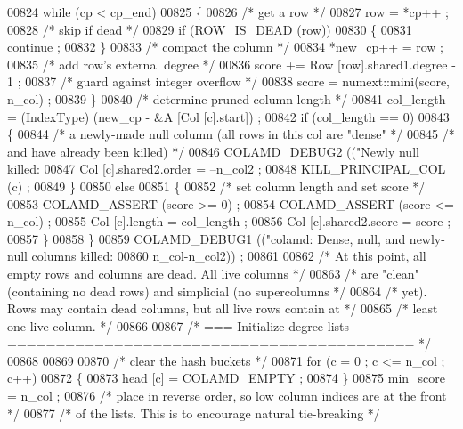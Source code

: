 \begin{DoxyCode}
{{{{{{{{{{{{{{00824     \textcolor{keywordflow}{while} (cp < cp\_end)
00825     \{
00826       \textcolor{comment}{/* get a row */}
00827       row = *cp++ ;
00828       \textcolor{comment}{/* skip if dead */}
00829       \textcolor{keywordflow}{if} (ROW\_IS\_DEAD (row))
00830       \{
00831     continue ;
00832       \}
00833       \textcolor{comment}{/* compact the column */}
00834       *new\_cp++ = row ;
00835       \textcolor{comment}{/* add row's external degree */}
00836       score += Row [row].shared1.degree - 1 ;
00837       \textcolor{comment}{/* guard against integer overflow */}
00838       score = numext::mini(score, n\_col) ;
00839     \}
00840     \textcolor{comment}{/* determine pruned column length */}
00841     col\_length = (IndexType) (new\_cp - &A [Col [c].start]) ;
00842     \textcolor{keywordflow}{if} (col\_length == 0)
00843     \{
00844       \textcolor{comment}{/* a newly-made null column (all rows in this col are "dense" */}
00845       \textcolor{comment}{/* and have already been killed) */}
00846       COLAMD\_DEBUG2 ((\textcolor{stringliteral}{"Newly null killed: %
00847       Col [c].shared2.order = --n\_col2 ;
00848       KILL\_PRINCIPAL\_COL (c) ;
00849     \}
00850     \textcolor{keywordflow}{else}
00851     \{
00852       \textcolor{comment}{/* set column length and set score */}
00853       COLAMD\_ASSERT (score >= 0) ;
00854       COLAMD\_ASSERT (score <= n\_col) ;
00855       Col [c].length = col\_length ;
00856       Col [c].shared2.score = score ;
00857     \}
00858   \}
00859   COLAMD\_DEBUG1 ((\textcolor{stringliteral}{"colamd: Dense, null, and newly-null columns killed: %
00860           n\_col-n\_col2)) ;
00861 
00862   \textcolor{comment}{/* At this point, all empty rows and columns are dead.  All live columns */}
00863   \textcolor{comment}{/* are "clean" (containing no dead rows) and simplicial (no supercolumns */}
00864   \textcolor{comment}{/* yet).  Rows may contain dead columns, but all live rows contain at */}
00865   \textcolor{comment}{/* least one live column. */}
00866 
00867   \textcolor{comment}{/* === Initialize degree lists ========================================== */}
00868 
00869 
00870   \textcolor{comment}{/* clear the hash buckets */}
00871   \textcolor{keywordflow}{for} (c = 0 ; c <= n\_col ; c++)
00872   \{
00873     head [c] = COLAMD\_EMPTY ;
00874   \}
00875   min\_score = n\_col ;
00876   \textcolor{comment}{/* place in reverse order, so low column indices are at the front */}
00877   \textcolor{comment}{/* of the lists.  This is to encourage natural tie-breaking */}
}}}}}}}}}}}}}}}}
\end{DoxyCode}
